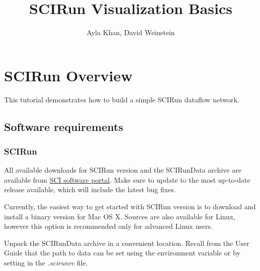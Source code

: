 \documentclass[fleqn,11pt,openany]{book}
\title{SCIRun Visualization Basics}
\author{Ayla Khan, David Weinstein}
\begin{document}



\maketitle


\chapter{SCIRun Overview} \label{overview}

\begin{introduction}
This tutorial demonstrates how to build a simple SCIRun dataflow network.
\end{introduction}

\section{Software requirements}

\subsection{SCIRun  \SCIRunVersion}

All available downloads for SCIRun version \SCIRunVersion and the SCIRunData archive are available from 
\href{http://www.scirun.org}{SCI software portal}.
Make sure to update to the most up-to-date release available, which will include
the latest bug fixes. 

Currently, the easiest way to get started with SCIRun version \SCIRunVersion is to download and install
a binary version for Mac OS X. 
Sources are also available for Linux, however this option is recommended
only for advanced Linux users.

Unpack the SCIRunData archive in a convenient location.
Recall from the User Guide that the path to data can be set using the
 environment variable or by setting
 in the \emph{.scirunrc} file.

\end{document}
